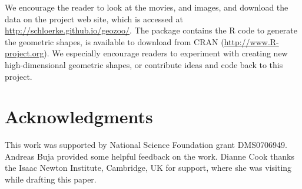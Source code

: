 We encourage the reader to look at the movies, and images, and
download the data on the project web site, which is accessed at \url{http://schloerke.github.io/geozoo/}. The 
package contains the R code to generate the geometric shapes, is
available to download from CRAN (\url{http://www.R-project.org}). We
especially encourage readers to experiment with creating new
high-dimensional geometric shapes, or contribute ideas and code back to this project.

\section*{Acknowledgments}

This work was supported by National Science Foundation grant
DMS0706949. Andreas Buja provided some helpful feedback on the
work. Dianne Cook thanks the Isaac Newton Institute, Cambridge, UK for
support, where she was visiting while drafting this paper.



\address{Barret Schloerke\\
  Department of Statistics \\
  Purdue University \\
  250 N. University Street\\
  West Lafayette, IN 47907\\
  USA} \\

\address{Hadley Wickham\\
  RStudio Inc} \\

\address{Dianne Cook\\
  Department of Econometrics and Business Statistics\\
  Monash University\\
  Wellington Road \\
  Clayton, Victoria 3800\\
  Australia}\\

\address{Heike Hofmann\\
  Department of Statistics\\
  Iowa State University \\
  Snedecor Hall \\
  Ames, Iowa 50011\\
  USA}\\
